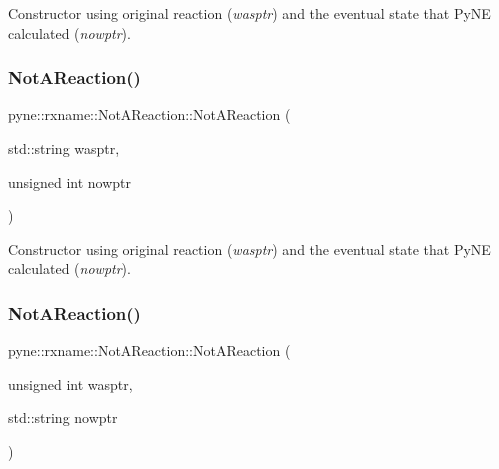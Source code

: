 Constructor using original reaction ({\itshape wasptr}) and the eventual state that Py\+NE calculated ({\itshape nowptr}). \mbox{\label{classpyne_1_1rxname_1_1_not_a_reaction_a9f3cea1e2ffd856bd3111569482244d2}} 
\subsubsection{\texorpdfstring{Not\+A\+Reaction()}{NotAReaction()}\hspace{0.1cm}{\footnotesize\ttfamily [5/7]}}
{\footnotesize\ttfamily pyne\+::rxname\+::\+Not\+A\+Reaction\+::\+Not\+A\+Reaction (\begin{DoxyParamCaption}\item[{std\+::string}]{wasptr,  }\item[{unsigned int}]{nowptr }\end{DoxyParamCaption})\hspace{0.3cm}{\ttfamily [inline]}}

Constructor using original reaction ({\itshape wasptr}) and the eventual state that Py\+NE calculated ({\itshape nowptr}). \mbox{\label{classpyne_1_1rxname_1_1_not_a_reaction_ab5ff27c0ce93ac29da63ab32e7fa44e3}} 
\subsubsection{\texorpdfstring{Not\+A\+Reaction()}{NotAReaction()}\hspace{0.1cm}{\footnotesize\ttfamily [6/7]}}
{\footnotesize\ttfamily pyne\+::rxname\+::\+Not\+A\+Reaction\+::\+Not\+A\+Reaction (\begin{DoxyParamCaption}\item[{unsigned int}]{wasptr,  }\item[{std\+::string}]{nowptr }\end{DoxyParamCaption})\hspace{0.3cm}{\ttfamily [inline]}}

